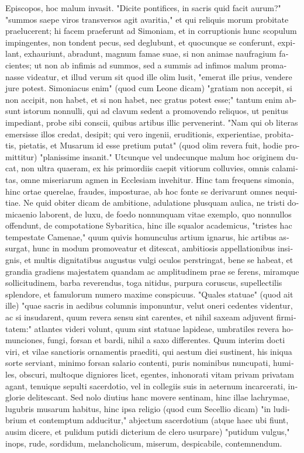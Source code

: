 \begin{latin}
Episcopos, hoc malum invasit. "Dicite pontifices, in
sacris quid facit aurum?" "summos saepe viros
transversos agit avaritia," et qui reliquis morum probitate praelucerent; hi
facem praeferunt ad Simoniam, et in corruptionis hunc scopulum impingentes,
non tondent pecus, sed deglubunt, et quocunque se conferunt, expilant,
exhauriunt, abradunt, magnum famae suae, si non animae naufragium facientes;
ut non ab infimis ad summos, sed a summis ad infimos malum promanasse
videatur, et illud verum sit quod ille olim lusit, "emerat ille prius,
vendere jure potest. Simoniacus enim" (quod cum Leone dicam) "gratiam non
accepit, si non accipit, non habet, et si non habet, nec gratus potest esse;"
tantum enim absunt istorum nonnulli, qui ad clavum sedent a promovendo
reliquos, ut penitus impediant, probe sibi conscii, quibus artibus illic
pervenerint. "Nam qui ob literas emersisse illos credat,
desipit; qui vero ingenii, eruditionis, experientiae, probitatis, pietatis,
et Musarum id esse pretium putat" (quod olim revera fuit, hodie promittitur)
"planissime insanit." Utcunque vel undecunque malum hoc originem ducat, non
ultra quaeram, ex his primordiis caepit vitiorum colluvies, omnis calamitas,
omne miseriarum agmen in Ecclesiam invehitur. Hinc tam frequens simonia, hinc
ortae querelae, fraudes, imposturae, ab hoc fonte se derivarunt omnes
nequitiae. Ne quid obiter dicam de ambitione, adulatione plusquam aulica, ne
tristi domicaenio laborent, de luxu, de foedo nonnunquam vitae exemplo, quo
nonnullos offendunt, de compotatione Sybaritica, \etc{} hinc ille squalor
academicus, "tristes hac tempestate Camenae," quum quivis homunculus artium
ignarus, hic artibus assurgat, hunc in modum promoveatur et ditescat,
ambitiosis appellationibus insignis, et multis dignitatibus augustus vulgi
oculos perstringat, bene se habeat, et grandia gradiens majestatem quandam ac
amplitudinem prae se ferens, miramque sollicitudinem, barba reverendus, toga
nitidus, purpura coruscus, supellectilis splendore, et famulorum numero
maxime conspicuus. "Quales statuae" (quod ait ille)
"quae sacris in aedibus columnis imponuntur, velut oneri cedentes videntur,
ac si insudarent, quum revera sensu sint carentes, et nihil saxeam adjuvent
firmitatem:" atlantes videri volunt, quum sint statuae lapideae, umbratiles
revera homunciones, fungi, forsan et bardi, nihil a saxo differentes. Quum
interim docti viri, et vilae sanctioris ornamentis praediti, qui aestum diei
sustinent, his iniqua sorte serviant, minimo forsan salario contenti, puris
nominibus nuncupati, humiles, obscuri, multoque digniores licet, egentes,
inhonorati vitam privam privatam agant, tenuique sepulti sacerdotio, vel in
collegiis suis in aeternum incarcerati, inglorie delitescant. Sed nolo
diutius hanc movere sentinam, hinc illae lachrymae, lugubris musarum habitus,
hinc ipsa religio (quod cum Secellio dicam) "in
ludibrium et contemptum adducitur," abjectum sacerdotium (atque haec ubi
fiunt, ausim dicere, et pulidum putidi dicterium de clero
usurpare) "putidum vulgus," inops, rude, sordidum, melancholicum, miserum,
despicabile, contemnendum.
\end{latin}

